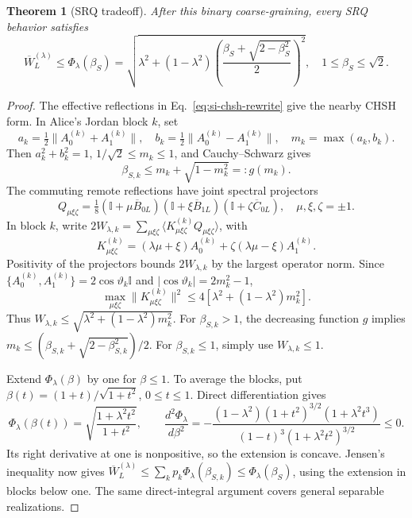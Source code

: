 \documentclass[aps,10pt,onecolumn,prx,superscriptaddress,longbibliography,nofootinbib]{revtex4-2}
\newcommand{\id}{\mathbb I}
\newtheorem{theorem}{Theorem}
\begin{document}
\begin{theorem}[SRQ tradeoff]\label{thm:si-lambda}
After this binary coarse-graining, every SRQ behavior satisfies
\begin{equation}
 \overline W_L^{(\lambda)}\leq\Phi_\lambda(\beta_S)
 =\sqrt{\lambda^2+(1-\lambda^2)
 \left(\frac{\beta_S+\sqrt{2-\beta_S^2}}2\right)^2},
 \quad1\leq\beta_S\leq\sqrt2.
 \label{eq:si-lambda-bound}
\end{equation}
\end{theorem}
\begin{proof}
The effective reflections in Eq.~\eqref{eq:si-chsh-rewrite} give the nearby CHSH form. In Alice's Jordan block \(k\), set
\begin{equation}
 a_k=\tfrac12\|A_0^{(k)}+A_1^{(k)}\|,\quad
 b_k=\tfrac12\|A_0^{(k)}-A_1^{(k)}\|,\quad m_k=\max(a_k,b_k).
\end{equation}
Then \(a_k^2+b_k^2=1\), \(1/\sqrt2\leq m_k\leq1\), and Cauchy--Schwarz gives
\begin{equation}
 \beta_{S,k}\leq m_k+\sqrt{1-m_k^2}=:g(m_k).
 \label{eq:si-short-block}
\end{equation}
The commuting remote reflections have joint spectral projectors
\begin{equation}
 Q_{\mu\xi\zeta}=\tfrac18(\id+\mu\overline B_{0L})(\id+\xi\overline B_{1L})(\id+\zeta\overline C_{0L}),
 \quad\mu,\xi,\zeta=\pm1.
\end{equation}
In block \(k\), write \(2W_{\lambda,k}=\sum_{\mu\xi\zeta}\langle K^{(k)}_{\mu\xi\zeta}Q_{\mu\xi\zeta}\rangle\), with
\begin{equation}
 K^{(k)}_{\mu\xi\zeta}=(\lambda\mu+\xi)A_0^{(k)}+\zeta(\lambda\mu-\xi)A_1^{(k)}.
\end{equation}
Positivity of the projectors bounds \(2W_{\lambda,k}\) by the largest operator norm. Since \(\{A_0^{(k)},A_1^{(k)}\}=2\cos\vartheta_k\id\) and \(|\cos\vartheta_k|=2m_k^2-1\),
\begin{equation}
 \max_{\mu\xi\zeta}\|K^{(k)}_{\mu\xi\zeta}\|^2
 \leq4[\lambda^2+(1-\lambda^2)m_k^2].
\end{equation}
Thus \(W_{\lambda,k}\leq\sqrt{\lambda^2+(1-\lambda^2)m_k^2}\). For \(\beta_{S,k}>1\), the decreasing function \(g\) implies \(m_k\leq(\beta_{S,k}+\sqrt{2-\beta_{S,k}^2})/2\). For \(\beta_{S,k}\leq1\), simply use \(W_{\lambda,k}\leq1\).

Extend \(\Phi_\lambda(\beta)\) by one for \(\beta\leq1\). To average the blocks, put \(\beta(t)=(1+t)/\sqrt{1+t^2}\), \(0\leq t\leq1\). Direct differentiation gives
\begin{equation}
 \Phi_\lambda(\beta(t))=\sqrt{\frac{1+\lambda^2t^2}{1+t^2}},\qquad
 \frac{d^2\Phi_\lambda}{d\beta^2}
 =-\frac{(1-\lambda^2)(1+t^2)^{3/2}(1+\lambda^2t^3)}
 {(1-t)^3(1+\lambda^2t^2)^{3/2}}\leq0.
 \label{eq:si-phi-concavity}
\end{equation}
Its right derivative at one is nonpositive, so the extension is concave. Jensen's inequality now gives \(\overline W_L^{(\lambda)}\leq\sum_kp_k\Phi_\lambda(\beta_{S,k})\leq\Phi_\lambda(\beta_S)\), using the extension in blocks below one. The same direct-integral argument covers general separable realizations.
\end{proof}
\end{document}
